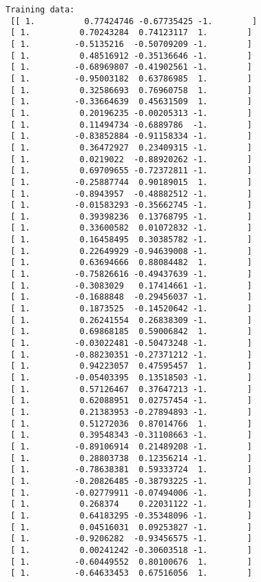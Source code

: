 \documentclass{article}
\begin{document}
\begin{lstlisting}[breaklines=true,basicstyle=\small]
Training data:
 [[ 1.          0.77424746 -0.67735425 -1.        ]
 [ 1.          0.70243284  0.74123117  1.        ]
 [ 1.         -0.5135216  -0.50709209 -1.        ]
 [ 1.          0.48516912 -0.35136646 -1.        ]
 [ 1.         -0.68969807 -0.41902561 -1.        ]
 [ 1.         -0.95003182  0.63786985  1.        ]
 [ 1.          0.32586693  0.76960758  1.        ]
 [ 1.         -0.33664639  0.45631509  1.        ]
 [ 1.          0.20196235 -0.00205313 -1.        ]
 [ 1.          0.11494734 -0.6889786  -1.        ]
 [ 1.         -0.83852884 -0.91158334 -1.        ]
 [ 1.          0.36472927  0.23409315 -1.        ]
 [ 1.          0.0219022  -0.88920262 -1.        ]
 [ 1.          0.69709655 -0.72372811 -1.        ]
 [ 1.         -0.25887744  0.90189015  1.        ]
 [ 1.         -0.8943957  -0.48882512 -1.        ]
 [ 1.         -0.01583293 -0.35662745 -1.        ]
 [ 1.          0.39398236  0.13768795 -1.        ]
 [ 1.          0.33600582  0.01072832 -1.        ]
 [ 1.          0.16458495  0.30385782 -1.        ]
 [ 1.          0.22649929 -0.94639008 -1.        ]
 [ 1.          0.63694666  0.88084482  1.        ]
 [ 1.         -0.75826616 -0.49437639 -1.        ]
 [ 1.         -0.3083029   0.17414661 -1.        ]
 [ 1.         -0.1688848  -0.29456037 -1.        ]
 [ 1.          0.1873525  -0.14520642 -1.        ]
 [ 1.          0.26241554  0.26838309 -1.        ]
 [ 1.          0.69868185  0.59006842  1.        ]
 [ 1.         -0.03022481 -0.50473248 -1.        ]
 [ 1.         -0.88230351 -0.27371212 -1.        ]
 [ 1.          0.94223057  0.47595457  1.        ]
 [ 1.         -0.05403395  0.13518503 -1.        ]
 [ 1.          0.57126467  0.37647213 -1.        ]
 [ 1.          0.62088951  0.02757454 -1.        ]
 [ 1.          0.21383953 -0.27894893 -1.        ]
 [ 1.          0.51272036  0.87014766  1.        ]
 [ 1.          0.39548343 -0.31108663 -1.        ]
 [ 1.         -0.89106914  0.21489208 -1.        ]
 [ 1.          0.28803738  0.12356214 -1.        ]
 [ 1.         -0.78638381  0.59333724  1.        ]
 [ 1.         -0.20826485 -0.38793225 -1.        ]
 [ 1.         -0.02779911 -0.07494006 -1.        ]
 [ 1.          0.268374    0.22031122 -1.        ]
 [ 1.          0.64183295 -0.35348096 -1.        ]
 [ 1.          0.04516031  0.09253827 -1.        ]
 [ 1.         -0.9206282  -0.93456575 -1.        ]
 [ 1.          0.00241242 -0.30603518 -1.        ]
 [ 1.         -0.60449552  0.80100676  1.        ]
 [ 1.         -0.64633453  0.67516056  1.        ]

\end{lstlisting}
\end{document}
